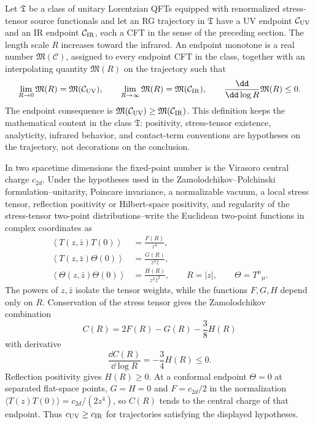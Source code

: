 Let \(\mathfrak T\) be a class of unitary Lorentzian QFTs equipped with
renormalized stress-tensor source functionals and let an RG trajectory in
\(\mathfrak T\) have a UV endpoint \(\mathcal C_{\rm UV}\) and an IR endpoint
\(\mathcal C_{\rm IR}\), each a CFT in the sense of the preceding section.
The length scale \(R\) increases toward the infrared.  An endpoint monotone is
a real number \(\mathfrak M(\mathcal C)\), assigned to every endpoint CFT in
the class, together with an interpolating quantity \(\mathfrak M(R)\) on the
trajectory such that
\[
  \lim_{R\to0}\mathfrak M(R)=\mathfrak M(\mathcal C_{\rm UV}),
  \qquad
  \lim_{R\to\infty}\mathfrak M(R)=\mathfrak M(\mathcal C_{\rm IR}),
  \qquad
  \frac{\dd}{\dd\log R}\mathfrak M(R)\leq0 .
\]
The endpoint consequence is
\(\mathfrak M(\mathcal C_{\rm UV})\geq
\mathfrak M(\mathcal C_{\rm IR})\).  This definition keeps the mathematical
content in the class \(\mathfrak T\): positivity, stress-tensor existence,
analyticity, infrared behavior, and contact-term conventions are hypotheses
on the trajectory, not decorations on the conclusion.

In two spacetime dimensions the fixed-point number is the Virasoro central
charge \(c_{2d}\).  Under the hypotheses used in the
Zamolodchikov--Polchinski formulation--unitarity, Poincare invariance,
a normalizable vacuum, a local stress tensor, reflection positivity or
Hilbert-space positivity, and regularity of the stress-tensor two-point
distributions--write the Euclidean two-point functions in complex coordinates
as
\begin{align}
  \left\langle T(z,\bar z)T(0)\right\rangle
  &=
  \frac{F(R)}{z^4},
  \nonumber\\
  \left\langle T(z,\bar z)\Theta(0)\right\rangle
  &=
  \frac{G(R)}{z^3\bar z},
  \nonumber\\
  \left\langle \Theta(z,\bar z)\Theta(0)\right\rangle
  &=
  \frac{H(R)}{z^2\bar z^2},
  \qquad
  R=|z|,
  \qquad
  \Theta=T^\mu{}_\mu .
  \label{eq:zamolodchikov-form-factors}
\end{align}
The powers of \(z,\bar z\) isolate the tensor weights, while the functions
\(F,G,H\) depend only on \(R\).  Conservation of the stress tensor gives the
Zamolodchikov combination
\begin{equation}
  C(R)=2F(R)-G(R)-\frac38H(R)
  \label{eq:zamolodchikov-c-function}
\end{equation}
with derivative
\begin{equation}
  \frac{\dd C(R)}{\dd\log R}
  =
  -\frac34H(R)\leq0 .
  \label{eq:two-dimensional-c-function-derivative}
\end{equation}
Reflection positivity gives \(H(R)\geq0\).  At a conformal endpoint
\(\Theta=0\) at separated flat-space points, \(G=H=0\) and
\(F=c_{2d}/2\) in the normalization
\(\langle T(z)T(0)\rangle=c_{2d}/(2z^4)\), so \(C(R)\) tends to the central
charge of that endpoint.  Thus \(c_{\rm UV}\geq c_{\rm IR}\) for trajectories
satisfying the displayed hypotheses.

